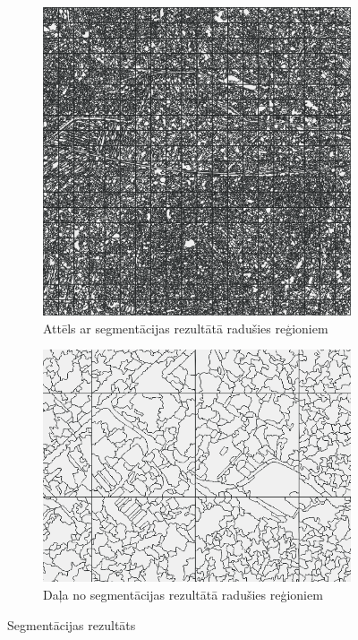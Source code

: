 \documentclass[12pt,paper=a4]{report}
\begin{document}
\begin{figure}[h!]
\centering
\begin{subfigure}[b]{.41\linewidth}
\includegraphics[width=\linewidth]{vissPolygons}
\caption{Attēls ar segmentācijas rezultātā radušies reģioniem}
\label{fig:regionsFull}
\end{subfigure}
\begin{subfigure}[b]{.54\linewidth}
\includegraphics[width=\linewidth]{regionFragments}
\caption{Daļa no segmentācijas rezultātā radušies reģioniem \\}
\label{fig:regionsPart}
\end{subfigure}
\caption{Segmentācijas rezultāts}
\label{fig:regions}
\end{figure}
\end{document}
